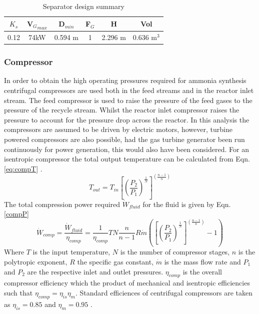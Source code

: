 \documentclass[11pt, a4paper]{article}
\begin{document}
{\begin{table}[!htbp]
	\begin{center}
		\caption{Separator design summary}
		\begin{tabular}{ |c|c|c|c|c|c| }
			\hline
			
			$K_s$ & V${_G}_{max}$&D$_{min}$ &F$_G$& H & Vol \\
			\hline
			0.12& 74kW & 0.594 m &1 & 2.296 m & 0.636 m$^3$\\
			
			
			\hline
		\end{tabular}
	\end{center}
\end{table}
\subsubsection{Compressor}
In order to obtain the high operating pressures required for ammonia synthesis centrifugal compressors are used both in the feed streams and in the reactor inlet stream. The feed compressor is used to raise the pressure of the feed gases to the pressure of the recycle stream. Whilst the reactor inlet compressor raises the pressure to account for the pressure drop across the reactor. In this analysis the compressors are assumed to be driven by electric motors, however, turbine powered compressors are also possible, had the gas turbine generator been run continuously for power generation, this would also have been considered. 
For an isentropic compressor the total output temperature can be calculated from Eqn. \ref{eq:compT} \cite{Morgan2013}.
\begin{equation}
\label{eq:compT}
T_{out} = T_{in}\left[ \left( \frac{P_2}{P_1}\right)^{\frac{1}{N}} \right]^{\left( \frac{n-1}{n}\right)} 
\end{equation}
The total 
compression power required $\dot W_{fluid}$ for the fluid is given by Eqn. \ref{compP}
\begin{equation}
\label{eq:compP}
\dot W_{comp} = \frac{ \dot W_{fluid}}{\eta_{comp}} = \frac{1}{\eta_{comp}} TN\frac{n}{n-1}R\dot m \left( \left[ \left( \frac{P_2}{P_1}\right)^{\frac{1}{N}} \right]^{\left( \frac{n-1}{n}\right)} - 1 \right)
\end{equation}
Where $T$ is the input temperature, $N$ is the number of compressor stages, $n$ is the polytropic exponent, $R$ the specific gas constant, $\dot m$ is the mass flow rate and $P_1$ and $P_2$ are the respective inlet and outlet pressures. $\eta_{comp}$ is the overall compressor efficiency which the product of mechanical and isentropic efficiencies such that $\eta_{comp} =\eta_{is}\eta_{m}$. Standard efficiences of centrifugal compressors are taken as $\eta_{is} = 0.85$ and $\eta_m = 0.95$ \cite{Penkuhn2017}. 

}
\end{document}
